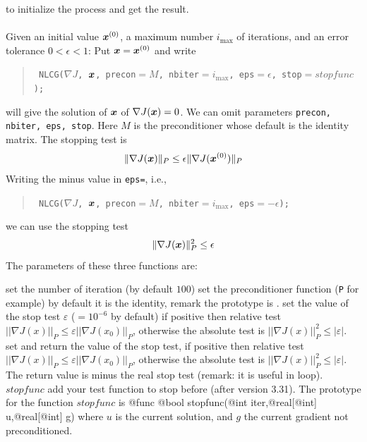 \documentclass[a4paper,twoside,12pt]{book}
\def\vec#1{\mbox{\boldmath $#1$}}
\begin{document}
 to initialize the process and get the result.
\\\\
Given an initial value $\vec{x}^{(0)}$, a maximum number $i_{\max}$
of iterations, and an error tolerance $0<\epsilon<1$:
Put $\vec{x}=\vec{x}^{(0)}$ and write
\begin{quote}\texttt{
NLCG($\nabla J$, $\vec{x}$, precon$=M$, nbiter$=i_{\max}$, eps$=\epsilon$, stop$=stopfunc$);
}
\end{quote}
will give the solution of $\vec{x}$ of $\nabla J(\vec{x})=0$.
We can omit parameters \texttt{precon, nbiter, eps, stop}.
Here $M$ is the preconditioner whose default is the identity matrix.
The stopping test is
\[
\| \nabla J(\vec{x})\|_P\le \epsilon\| \nabla J(\vec{x}^{(0)})\|_P
\]
Writing the minus value in \texttt{eps=}, i.e.,
\begin{quote}\texttt{
NLCG($\nabla J$, $\vec{x}$, precon$=M$, nbiter$=i_{\max}$, eps$=-\epsilon$);
}
\end{quote}
we can use the stopping test
\[
\| \nabla J(\vec{x})\|_P^2\le \epsilon
\]
The  parameters of these three functions are:
  
  
  
\begin{description}

\itemtt[nbiter=] set the number of iteration (by default $100$)
\itemtt[precon=] set the preconditioner function (\texttt{P} for example)   by default it is the identity, remark the prototype
is .
\itemtt[eps=] set the value of the stop test $\varepsilon$ ($=10^{-6}$ by default) if positive then relative test
$||\nabla J(x)||_P\leq \varepsilon||\nabla J(x_0)||_P$, otherwise the  absolute test is  $||\nabla J(x)||_P^2\leq |\varepsilon|$.
\itemtt[veps=] set and return the value of the stop test,  if positive then relative test
$||\nabla J(x)||_P\leq \varepsilon||\nabla J(x_0)||_P$, otherwise the  absolute test is  $||\nabla J(x)||_P^2\leq |\varepsilon|$.
The return value is  minus  the real stop test (remark: it is useful in loop).
\itemtt[stop=]$stopfunc$ add your test function to stop before (after version 3.31). The prototype for the function  $stopfunc$ is
\bFF
          @func  @bool stopfunc(@int iter,@real[@int] u,@real[@int] g)
\eFF
where $u$ is the current solution, and $g$ the current gradient not preconditioned.
\end{description}
\end{document}
